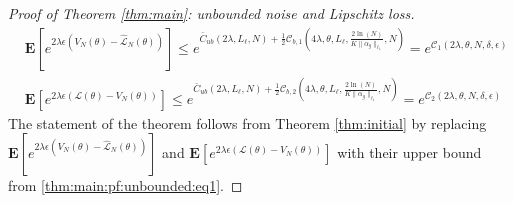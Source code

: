 \documentclass{article}
\def\rve{{\mathbf{e}}}
\newcommand{\bE}{\mathbf{E}}
\begin{document}
\begin{proof}[Proof of Theorem \ref{thm:main}: unbounded noise and Lipschitz loss]
\begin{equation}
 \begin{aligned}
    & \bE[e^{2\lambda \epsilon (V_N(\theta)-\hat{\mathcal{L}}_N(\theta))}] \le 
    e^{\bar{C}_{ub}(2\lambda,L_{\ell},N)+ \frac{1}{2}\mathcal{C}_{b,1}(4\lambda,\theta,L_{\ell},\frac{2\ln(N)}{K\|\alpha_g\|_{\ell_1}},N)}=
    e^{\mathcal{C}_1(2\lambda,\theta,N,\delta,\epsilon)}
    \\
    &  \bE[e^{2\lambda \epsilon (\mathcal{L}(\theta)-V_N(\theta))}]  \le e^{\bar{C}_{ub}(2\lambda,L_{\ell},N)+\frac{1}{2}\mathcal{C}_{b,2}(4\lambda,\theta,L_{\ell},\frac{2\ln(N)}{K\|\alpha_g\|_{\ell_1}},N)}=e^{\mathcal{C}_2(2\lambda,\theta,N,\delta,\epsilon)}
 \end{aligned}
\end{equation}
 The statement of the theorem follows from Theorem \ref{thm:initial}
  by replacing $\bE[e^{2\lambda \epsilon(V_N(\theta)-\hat{\mathcal{L}}_N(\theta))}]$ and $\bE[e^{2\lambda \epsilon (\mathcal{L}(\theta)-V_N(\theta))}]$ with their upper bound from \eqref{thm:main:pf:unbounded:eq1}. 


\end{proof}
\end{document}

